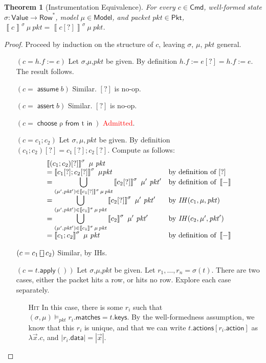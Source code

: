 \documentclass{article}
\newcommand{\pkt}{\mathit{pkt}}
\newcommand{\denote}[1]{\left\llbracket#1\right\rrbracket}
\newcommand{\Value}{\mathsf{Value}}
\newcommand{\Cmd}{\mathsf{Cmd}}
\newcommand{\Pkt}{\mathsf{Pkt}}
\newcommand{\Model}{\mathsf{Model}}
\newcommand{\Row}{\mathsf{Row}}
\newcommand{\matches}{\mathsf{matches}}
\newcommand{\action}{\mathsf{action}}
\newcommand{\actions}{\mathsf{actions}}
\newcommand{\keys}{\mathsf{keys}}
\newcommand{\data}{\mathsf{data}}
\newcommand{\assert}{\mathop{\mathsf{assert}}}
\newcommand{\assume}{\mathop{\mathsf{assume}}}
\newcommand{\apply}{\mathsf{apply}}
\newcommand{\choiceop}{\rotatebox[origin=c]{90}{$\sqsubset\!\!\!\sqsupset$}}
\newcommand{\choice}{\mathbin{\choiceop}}
\renewcommand{\choose}[2]{\mathop{\mathsf{choose}~#1~\mathsf{from}~#2~\mathsf{in}}}
\newcommand{\satisfy}[3]{({#1,#3}) \models_{#2}}
\newtheorem{theorem}{Theorem}
\begin{document}
\begin{theorem}[Instrumentation Equivalence]
  \label{thm:instr-equiv}
  For every $c \in \Cmd$, well-formed state $\sigma : \Value \to \Row^*$, model
  $\mu \in \Model$, and packet $\pkt \in \Pkt$, $\denote{c}^\sigma~\mu~\pkt =
  \denote{c[?]}^\sigma~\mu~\pkt$.
\end{theorem}

\begin{proof}
  Proceed by induction on the structure of $c$, leaving $\sigma$, $\mu$, $\pkt$ general.
  \begin{enumerate}[align=left]
  \item[$(c = h.f := e)$]
    Let $\sigma$,$\mu$,$\pkt$ be given.
    By definition $h.f:=e[?] = h.f:=e$. The result follows.
  \item[$(c = \assume b)$] Similar. $[?]$ is no-op.
  \item[$(c = \assert b)$] Similar. $[?]$ is no-op.
  \item[$(c = \choose \rho t)$] \textcolor{red}{Admitted}.
  \item[$(c = c_1;c_2)$]
    Let $\sigma,\mu,\pkt$ be given.
    By definition $(c_1;c_2)[?] = c_1[?]; c_2[?]$.
    Compute as follows:
    \[\begin{array}{>{\displaystyle}ll}
    \denote{(c_1;c_2)[?]}^\sigma~\mu~\pkt \\
    = \denote{c_1[?];c_2[?]}^\sigma~\mu\pkt
    & \text{by definition of } [?]  \\
    = \bigcup_{(\mu',\pkt') \in \denote{c_1[?]}^\sigma\,\mu\,\pkt}\denote{c_2[?]}^\sigma~\mu'~\pkt'
    & \text{by definition of }\denote{-} \\
    = \bigcup_{(\mu',\pkt') \in \denote{c_1}^\sigma\,\mu\,\pkt}\denote{c_2[?]}^\sigma~\mu'~\pkt'
    & \text{by } \mathit{IH}(c_1, \mu, \pkt) \\
    = \bigcup_{(\mu',\pkt') \in \denote{c_1}^\sigma\,\mu\,\pkt}\denote{c_2}^\sigma~\mu'~\pkt'
    & \text{by } \mathit{IH}(c_2, \mu', \pkt') \\
    = \denote{c_1;c_2}^\sigma~\mu~\pkt
    & \text{by definition of } \denote{-}
    \end{array}
    \]
  \item[$(c = c_1 \choice c_2)$] Similar, by IHs.

  \item[$(c = t.\apply())$]
    Let $\sigma$,$\mu$,$\pkt$ be given.
    Let $r_1,\ldots,r_n = \sigma(t)$.
    There are two cases, either the packet hits a row, or hits no row. Explore each case separately.
    \begin{enumerate}
    \item[\textsc{Hit}] In this case, there is some $r_i$ such that $\satisfy \sigma \pkt \mu r_i.\matches = t.\keys$. By the well-formedness assumption,
      we know that this $r_i$ is unique, and that we can write
      $t.\actions[r_i.\action]$ as $\lambda \vec x. c$, and $|r_i.\data| = |\vec x|$.


\end{enumerate}
\end{enumerate}
\end{proof}
\end{document}
